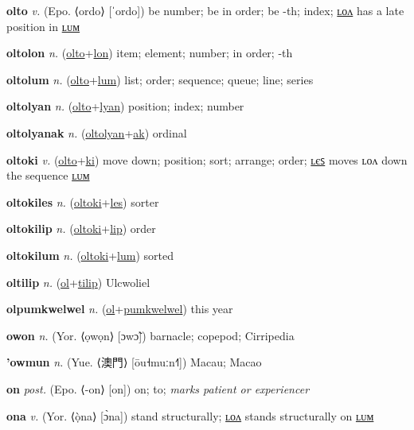 \textbf{\hypertarget{olto}{olto}} \textit{v.} (Epo. ⟨ordo⟩ [ˈordo])
be number; be in order; be -th; index; \hyperlink{oltolon}{ʟᴏᴧ} has a late position in \hyperlink{oltolum}{ʟᴜᴍ}

\textbf{\hypertarget{oltolon}{oltolon}} \textit{n.} (\hyperlink{olto}{olto}+\allowbreak \hyperlink{lon}{lon})
item; element; number; in order; -th

\textbf{\hypertarget{oltolum}{oltolum}} \textit{n.} (\hyperlink{olto}{olto}+\allowbreak \hyperlink{lum}{lum})
list; order; sequence; queue; line; series

\textbf{\hypertarget{oltolyan}{oltolyan}} \textit{n.} (\hyperlink{olto}{olto}+\allowbreak \hyperlink{lyan}{lyan})
position; index; number

\textbf{\hypertarget{oltolyanak}{oltolyanak}} \textit{n.} (\hyperlink{oltolyan}{oltolyan}+\allowbreak \hyperlink{ak}{ak})
ordinal

\textbf{\hypertarget{oltoki}{oltoki}} \textit{v.} (\hyperlink{olto}{olto}+\allowbreak \hyperlink{ki}{ki})
move down; position; sort; arrange; order; \hyperlink{oltokiles}{ʟєꜱ} moves ʟᴏᴧ down the sequence \hyperlink{oltokilum}{ʟᴜᴍ}

\textbf{\hypertarget{oltokiles}{oltokiles}} \textit{n.} (\hyperlink{oltoki}{oltoki}+\allowbreak \hyperlink{les}{les})
sorter

\textbf{\hypertarget{oltokilip}{oltokilip}} \textit{n.} (\hyperlink{oltoki}{oltoki}+\allowbreak \hyperlink{lip}{lip})
order

\textbf{\hypertarget{oltokilum}{oltokilum}} \textit{n.} (\hyperlink{oltoki}{oltoki}+\allowbreak \hyperlink{lum}{lum})
sorted

\textbf{\hypertarget{oltilip}{oltilip}} \textit{n.} (\hyperlink{ol}{ol}+\allowbreak \hyperlink{tilip}{tilip})
Ulcwoliel

\textbf{\hypertarget{olpumkwelwel}{olpumkwelwel}} \textit{n.} (\hyperlink{ol}{ol}+\allowbreak \hyperlink{pumkwelwel}{pumkwelwel})
this year

\textbf{\hypertarget{owon}{owon}} \textit{n.} (Yor. ⟨ọwọn⟩ [ɔwɔ̃])
barnacle; copepod; Cirripedia

\textbf{\hypertarget{'owmun}{'owmun}} \textit{n.} (Yue. ⟨{\chinese{}澳門}⟩ [ōu˧muːn˧˥])
Macau; Macao

\textbf{\hypertarget{on}{on}} \textit{post.} (Epo. ⟨-on⟩ [on])
on; to; \textit{marks patient or experiencer}

\textbf{\hypertarget{ona}{ona}} \textit{v.} (Yor. ⟨ọ̀na⟩ [ɔ̀na])
stand structurally; \hyperlink{onalon}{ʟᴏᴧ} stands structurally on \hyperlink{onalum}{ʟᴜᴍ}

